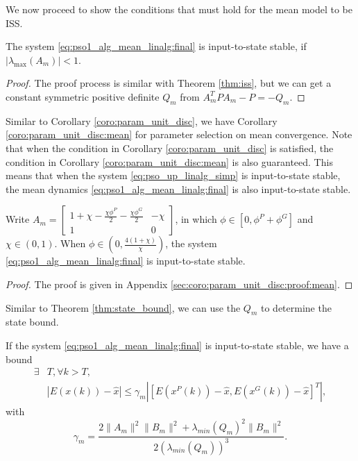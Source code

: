 We now proceed to show the conditions that must hold for the mean model to be ISS.
\begin{mythm}
\label{thm:iss:mean}
	The system \eqref{eq:pso1_alg_mean_linalg:final} is input-to-state stable, if $ | \lambda_{\max} ( A_{m} ) | < 1 $.
	\begin{proof}
		The proof process is similar with Theorem \ref{thm:iss}, but we can get a constant symmetric positive definite $ Q_{m} $ from $ A_{m}^{T} P A_{m} - P = - Q_{m} $.
	\end{proof}
\end{mythm}


Similar to Corollary \ref{coro:param_unit_disc}, we have Corollary \ref{coro:param_unit_disc:mean} for parameter selection on mean convergence.
Note that when the condition in Corollary \ref{coro:param_unit_disc} is satisfied, the condition in Corollary \ref{coro:param_unit_disc:mean} is also guaranteed.
This means that when the system \eqref{eq:pso_up_linalg_simp} is input-to-state stable, the mean dynamics \eqref{eq:pso1_alg_mean_linalg:final} is also input-to-state stable.

\begin{mycoro}
\label{coro:param_unit_disc:mean}
Write $ A_{m} = \begin{bmatrix}
1 + \chi - \frac{ \chi \phi^{P} }{2} - \frac{ \chi \phi^{G} }{2} & -\chi \\
1 & 0
\end{bmatrix} 
$, in which
$ \phi \in [0,  \phi^{P} + \phi^{G} ] $ and $ \chi \in ( 0, 1 ) $.
When $ \phi \in \left( 0 , \frac{4(1+\chi)}{\chi} \right) $, the system \eqref{eq:pso1_alg_mean_linalg:final} is input-to-state stable.
\begin{proof}
The proof is given in Appendix \ref{sec:coro:param_unit_disc:proof:mean}.
\end{proof}
\end{mycoro}


Similar to Theorem \ref{thm:state_bound}, we can use the $ Q_{m} $ to determine the state bound.
\begin{mycoro}
\label{coro:bound:mean}
If the system \eqref{eq:pso1_alg_mean_linalg:final} is input-to-state stable, we have a bound 
\begin{equation}
\begin{aligned}
\exists & T , \forall  k > T, \\
& | E( x(k) ) - \hat{x} | \leq  \gamma_{m} | [ E( x^{P}(k) ) - \hat{x} ,  E( x^{G}(k) ) - \hat{x} ]^{T} |,
\end{aligned}
\end{equation}
with 
\begin{equation}
\gamma_{m} = \frac{ 2 \lVert A_{m} \rVert^{2} \lVert B_{m} \rVert^{2} + \lambda_{min}( Q_{m} )^{2} \lVert B_{m} \rVert^{2} }{ 2( \lambda_{min}( Q_{m} ) )^{3} }.
\end{equation}
\end{mycoro}

